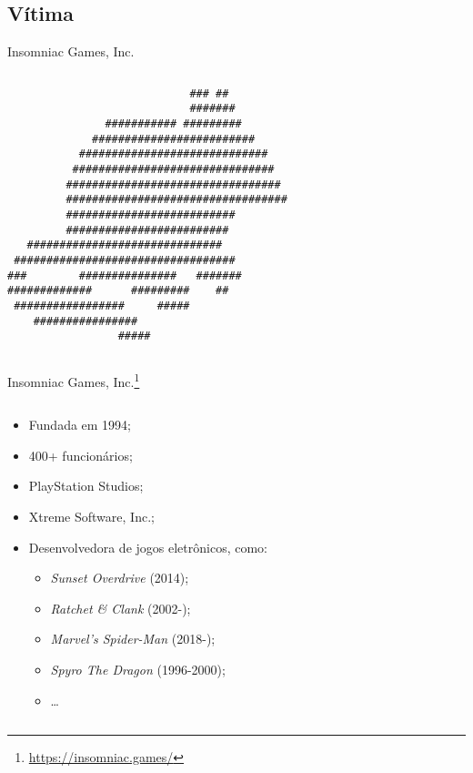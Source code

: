 \documentclass[bookmarks=false,aspectratio=169,9pt]{beamer}
\begin{document}
\subsection{Vítima}
\begin{frame}[fragile]{Insomniac Games, Inc.}
\begin{columns}
\begin{column}{0.5\textwidth}
\begin{verbatim}
                            ### ##
                            #######
               ########### #########
             #########################
           #############################
          ###############################
         #################################
         ##################################
         ##########################
         #########################
   ##############################
 ##################################
###        ###############   #######
#############      #########    ##
 #################     #####
    ################
                 #####
\end{verbatim}
\end{column}
\end{columns}
\end{frame}
\begin{frame}{Insomniac Games, Inc.\footnote{\href{https://insomniac.games/}{https://insomniac.games/}}}
\begin{columns}
\begin{column}{0.5\textwidth}
	\begin{itemize}
		\item Fundada em 1994;
		\item 400+ funcionários;
		\item PlayStation Studios;
		\item Xtreme Software, Inc.;
		\item Desenvolvedora de jogos eletrônicos, como:
		      \begin{itemize}
			      \item \textit{Sunset Overdrive} (2014);
			      \item \textit{Ratchet \& Clank} (2002-);
			      \item \textit{Marvel's Spider-Man} (2018-);
			      \item \textit{Spyro The Dragon} (1996-2000);
			      \item \dots
		      \end{itemize}
	\end{itemize}
\end{column}
\end{columns}
\end{frame}
\end{document}
